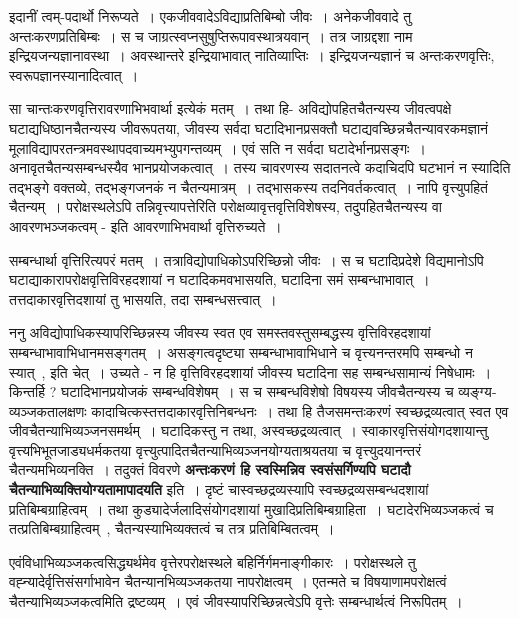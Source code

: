 	इदानीं त्वम्-पदार्थो निरूप्यते~। एकजीववादेऽविद्याप्रतिबिम्बो जीवः~। अनेकजीववादे तु अन्तःकरणप्रतिबिम्बः~। स च जाग्रत्स्वप्नसुषुप्तिरूपावस्थात्रयवान्~। तत्र जाग्रद्दशा नाम इन्द्रियजन्यज्ञानावस्था~। अवस्थान्तरे इन्द्रियाभावात् नातिव्याप्तिः~। इन्द्रियजन्यज्ञानं च अन्तःकरणवृत्तिः, स्वरूपज्ञानस्यानादित्वात्~।\par
	सा चान्तःकरणवृत्तिरावरणाभिभवार्था इत्येकं मतम्~। तथा हि- अविद्योपहितचैतन्यस्य जीवत्वपक्षे घटाद्यधिष्ठानचैतन्यस्य जीवरूपतया, जीवस्य सर्वदा घटादिभानप्रसक्तौ घटाद्यवच्छिन्नचैतन्यावरकमज्ञानं मूलाविद्यापरतन्त्रमवस्थापदवाच्यमभ्युपगन्तव्यम्~। एवं सति न सर्वदा घटादेर्भानप्रसङ्गः~। अनावृतचैतन्यसम्बन्धस्यैव भानप्रयोजकत्वात्~। तस्य चावरणस्य सदातनत्वे कदाचिदपि घटभानं न स्यादिति तद्भङ्गे वक्तव्ये, तद्भङ्गजनकं न चैतन्यमात्रम्~। तद्भासकस्य तदनिवर्तकत्वात्~। नापि वृत्त्युपहितं चैतन्यम्~। परोक्षस्थलेऽपि तन्निवृत्त्यापत्तेरिति परोक्षव्यावृत्तवृत्तिविशेषस्य, तदुपहितचैतन्यस्य वा आवरणभञ्जकत्वम् - इति आवरणाभिभवार्था वृत्तिरुच्यते~।\par
	सम्बन्धार्था वृत्तिरित्यपरं मतम्~। तत्राविद्योपाधिकोऽपरिच्छिन्नो जीवः~। स च घटादिप्रदेशे विद्यमानोऽपि घटाद्याकारापरोक्षवृत्तिविरहदशायां न घटादिकमवभासयति, घटादिना समं सम्बन्धाभावात्~। तत्तदाकारवृत्तिदशायां तु भासयति, तदा सम्बन्धसत्त्वात्~।\par
	ननु अविद्योपाधिकस्यापरिच्छिन्नस्य जीवस्य स्वत एव समस्तवस्तुसम्बद्धस्य वृत्तिविरहदशायां सम्बन्धाभावाभिधानमसङ्गतम्~। असङ्गत्वदृष्ट्या सम्बन्धाभावाभिधाने च वृत्त्यनन्तरमपि सम्बन्धो न स्यात्~, इति चेत्~। उच्यते - न हि वृत्तिविरहदशायां जीवस्य घटादिना सह सम्बन्धसामान्यं निषेधामः~। किन्तर्हि ? घटादिभानप्रयोजकं सम्बन्धविशेषम्~। स च सम्बन्धविशेषो विषयस्य जीवचैतन्यस्य च व्यङ्ग्य-व्यञ्जकतालक्षणः कादाचित्कस्तत्तदाकारवृत्तिनिबन्धनः~। तथा हि तैजसमन्तःकरणं स्वच्छद्रव्यत्वात् स्वत एव जीवचैतन्याभिव्यञ्जनसमर्थम्~। घटादिकस्तु न तथा, अस्वच्छद्रव्यत्वात्~। स्वाकारवृत्तिसंयोगदशायान्तु वृत्त्यभिभूतजाड्यधर्मकतया वृत्त्युत्पादितचैतन्याभिव्यञ्जनयोग्यताश्रयतया च वृत्त्युदयानन्तरं चैतन्यमभिव्यनक्ति~। तदुक्तं विवरणे {\bfseries अन्तःकरणं हि स्वस्मिन्निव स्वसंसर्गिण्यपि घटादौ चैतन्याभिव्यक्तियोग्यतामापादयति} इति~। दृष्टं चास्वच्छद्रव्यस्यापि स्वच्छद्रव्यसम्बन्धदशायां प्रतिबिम्बग्राहित्वम्~। तथा कुड्यादेर्जलादिसंयोगदशायां मुखादिप्रतिबिम्बग्राहिता~। घटादेरभिव्यञ्जकत्वं च तत्प्रतिबिम्बग्राहित्वम्~, चैतन्यस्याभिव्यक्तत्वं च तत्र प्रतिबिम्बितत्वम्~।\par
	एवंविधाभिव्यञ्जकत्वसिद्ध्यर्थमेव वृत्तेरपरोक्षस्थले बहिर्निर्गमनाङ्गीकारः~। परोक्षस्थले तु वह्न्यादेर्वृत्तिसंसर्गाभावेन चैतन्यानभिव्यञ्जकतया नापरोक्षत्वम्~। एतन्मते च विषयाणामपरोक्षत्वं चैतन्याभिव्यञ्जकत्वमिति द्रष्टव्यम्~। एवं जीवस्यापरिच्छिन्नत्वेऽपि वृत्तेः सम्बन्धार्थत्वं निरूपितम्~।\par

